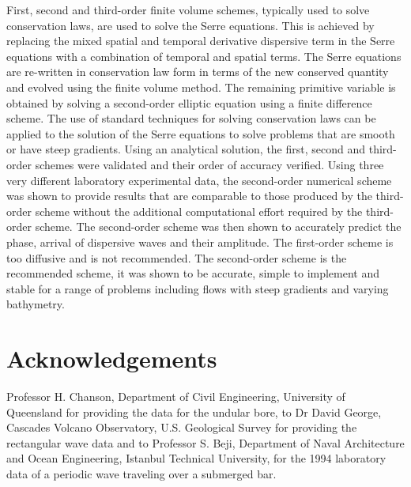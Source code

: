 \documentclass[preprint,sort&compress,1p]{article}
\begin{document}
First, second and third-order finite volume schemes, typically used to solve conservation laws, are used to solve the Serre equations. This is achieved by replacing the mixed spatial and temporal derivative dispersive term in the Serre equations with a combination of temporal and spatial terms. The Serre equations are re-written in conservation law form in terms of the new conserved quantity and evolved using the finite volume method. The remaining primitive variable is obtained by solving a second-order elliptic equation using a finite difference scheme. The use of standard techniques for solving conservation laws can be applied to the solution of the Serre equations to solve problems that are smooth or have steep gradients. Using an analytical solution, the first, second and third-order  schemes were validated and their order of accuracy verified. Using three very different laboratory experimental data, the second-order numerical scheme was shown to provide results that are comparable to those produced by the third-order scheme without the additional computational effort required by the third-order scheme. The second-order  scheme was then shown to accurately predict the phase, arrival of dispersive waves and their amplitude. The first-order scheme is too diffusive and is not recommended. The second-order scheme is the recommended scheme, it was shown to be accurate, simple to implement and stable for a range of problems including flows with steep gradients and varying bathymetry.

\section*{Acknowledgements}

Professor H. Chanson, Department of Civil Engineering, University of Queensland for providing the data for the undular bore, to Dr David George, Cascades Volcano Observatory, U.S. Geological Survey for providing the rectangular wave data and to Professor S. Beji, Department of Naval Architecture and Ocean Engineering, Istanbul Technical University, for the 1994 laboratory data of a periodic wave traveling over a submerged bar.
\end{document}
